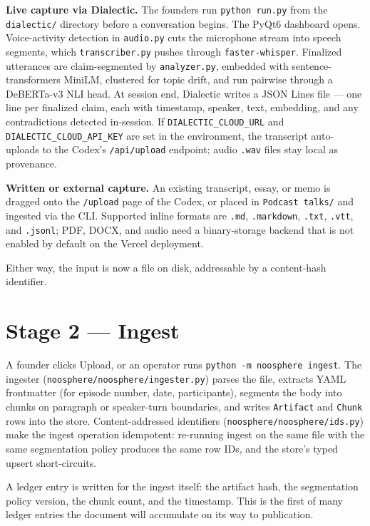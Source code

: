 \documentclass[11pt,letterpaper]{article}
\newcommand{\file}[1]{\texttt{#1}}
\begin{document}
\textbf{Live capture via Dialectic.} The founders run \file{python run.py} from the \file{dialectic/} directory before a conversation begins. The PyQt6 dashboard opens. Voice-activity detection in \file{audio.py} cuts the microphone stream into speech segments, which \file{transcriber.py} pushes through \file{faster-whisper}. Finalized utterances are claim-segmented by \file{analyzer.py}, embedded with sentence-transformers MiniLM, clustered for topic drift, and run pairwise through a DeBERTa-v3 NLI head. At session end, Dialectic writes a JSON Lines file --- one line per finalized claim, each with timestamp, speaker, text, embedding, and any contradictions detected in-session. If \texttt{DIALECTIC\_CLOUD\_URL} and \texttt{DIALECTIC\_CLOUD\_API\_KEY} are set in the environment, the transcript auto-uploads to the Codex's \file{/api/upload} endpoint; audio \file{.wav} files stay local as provenance.

\textbf{Written or external capture.} An existing transcript, essay, or memo is dragged onto the \file{/upload} page of the Codex, or placed in \file{Podcast talks/} and ingested via the CLI. Supported inline formats are \file{.md}, \file{.markdown}, \file{.txt}, \file{.vtt}, and \file{.jsonl}; PDF, DOCX, and audio need a binary-storage backend that is not enabled by default on the Vercel deployment.

Either way, the input is now a file on disk, addressable by a content-hash identifier.

\section{Stage 2 --- Ingest}

A founder clicks Upload, or an operator runs \texttt{python -m noosphere ingest}. The ingester (\file{noosphere/noosphere/ingester.py}) parses the file, extracts YAML frontmatter (for episode number, date, participants), segments the body into chunks on paragraph or speaker-turn boundaries, and writes \texttt{Artifact} and \texttt{Chunk} rows into the store. Content-addressed identifiers (\file{noosphere/noosphere/ids.py}) make the ingest operation idempotent: re-running ingest on the same file with the same segmentation policy produces the same row IDs, and the store's typed upsert short-circuits.

A ledger entry is written for the ingest itself: the artifact hash, the segmentation policy version, the chunk count, and the timestamp. This is the first of many ledger entries the document will accumulate on its way to publication.
\end{document}
